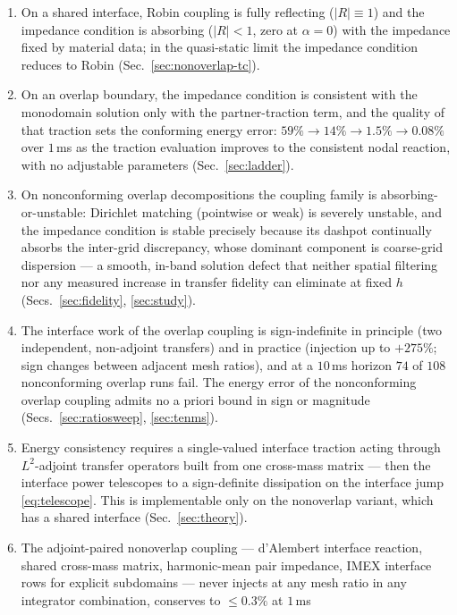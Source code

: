 \documentclass[11pt]{article}
\begin{document}
\begin{enumerate}[itemsep=2pt]
\item On a shared interface, Robin coupling is fully reflecting
  ($\lvert R \rvert \equiv 1$) and the impedance condition is absorbing
  ($\lvert R \rvert < 1$, zero at $\alpha = 0$) with the impedance fixed by
  material data; in the quasi-static limit the impedance condition
  reduces to Robin (Sec.~\ref{sec:nonoverlap-tc}).
\item On an overlap boundary, the impedance condition is consistent with
  the monodomain solution only with the partner-traction term, and the
  quality of that traction sets the conforming energy error:
  $59\% \to 14\% \to 1.5\% \to 0.08\%$ over $1$\,ms as the traction
  evaluation improves to the consistent nodal reaction, with no adjustable
  parameters (Sec.~\ref{sec:ladder}).
\item On nonconforming overlap decompositions the coupling family is
  absorbing-or-unstable: Dirichlet matching (pointwise or weak) is severely
  unstable, and the impedance condition is stable precisely because its
  dashpot continually absorbs the inter-grid discrepancy, whose dominant
  component is coarse-grid dispersion --- a smooth, in-band solution defect
  that neither spatial filtering nor any measured increase in transfer
  fidelity can eliminate at fixed $h$ (Secs.~\ref{sec:fidelity},
  \ref{sec:study}).
\item The interface work of the overlap coupling is sign-indefinite in
  principle (two independent, non-adjoint transfers) and in practice
  (injection up to $+275\%$; sign changes between adjacent mesh ratios), and
  at a $10$\,ms horizon $74$ of $108$ nonconforming overlap runs fail. The
  energy error of the nonconforming overlap coupling admits no a priori
  bound in sign or magnitude (Secs.~\ref{sec:ratiosweep},
  \ref{sec:tenms}).
\item Energy consistency requires a single-valued interface traction acting
  through $L^2$-adjoint transfer operators built from one cross-mass matrix
  --- then the interface power telescopes to a sign-definite dissipation on
  the interface jump \eqref{eq:telescope}. This is implementable only on
  the nonoverlap variant, which has a shared interface
  (Sec.~\ref{sec:theory}).
\item The adjoint-paired nonoverlap coupling --- d'Alembert interface
  reaction, shared cross-mass matrix, harmonic-mean pair impedance, IMEX
  interface rows for explicit subdomains --- never injects at any mesh
  ratio in any integrator combination, conserves to $\le 0.3\%$ at $1$\,ms

\end{enumerate}
\end{document}
